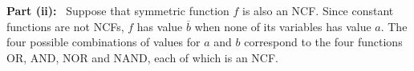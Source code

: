 \smallskip

\noindent
\textbf{Part (ii):}~
Suppose that symmetric function $f$ is also an NCF.  
Since constant functions are not NCFs,
$f$ has value $\overline{b}$ when none of its variables has value $a$.
The four possible combinations of values for $a$ and $b$ correspond
to the four functions OR, AND, NOR and NAND, each of which is an
NCF.  \QED








